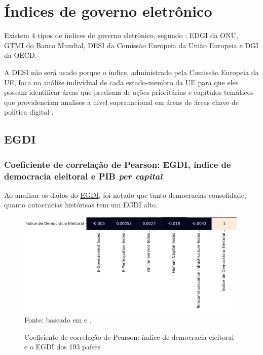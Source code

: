 \section{Índices de governo eletrônico}

Existem 4 tipos de índices de governo eletrônico, segundo \cite{martinez2022egovernment}: EDGI da ONU, GTMI do Banco Mundial, DESI da Comissão Europeia da União Europeia e DGI da OECD.

A DESI não será usado porque o índice, administrado pela Comissão Europeia da UE, foca no análise individual de cada estado-membro da UE para que eles possam identificar áreas que precisam de ações prioritárias e capítulos temáticos que providenciam analises a nível supranacional em áreas de áreas chave de política digital \cite{desi_2022}.

\subsection{EGDI}


\subsubsection{Coeficiente de correlação de Pearson: EGDI, índice de democracia eleitoral e PIB \textit{per capital}}

Ao analisar os dados do \href{https://publicadministration.un.org/egovkb/en-us/About/Overview/-E-Government-Development-Index}{EGDI}, foi notado que tanto democracias consolidade, quanto autocracias históricas tem um EGDI alto. 

\begin{figure}[H]
    \centering
    \caption{Coeficiente de correlação de Pearson: índice de democracia eleitoral e o EGDI dos 193 países}
    \includegraphics[width=1\linewidth]{figuras/egdi/correlacao3.png}
    \label{fig:correlacao3}
    \footnotesize{Fonte: baseado em \cite{ONU_edgi_mapa} e \cite{electoral_democracy_index}.}
\end{figure}


